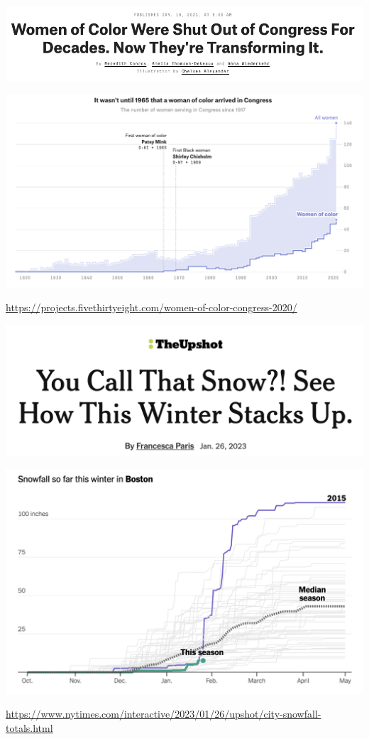 \documentclass[table]{beamer}\usepackage[]{graphicx}\usepackage[]{color}
\begin{document}
\begin{frame}

\centering

\includegraphics[width=\textwidth]{figure-static/538-women-of-color-banner.png}

\includegraphics[width=\textwidth]{figure-static/538-women-of-color-timeline.png}

\tiny \url{https://projects.fivethirtyeight.com/women-of-color-congress-2020/}

\end{frame}






\begin{frame}

\centering

\includegraphics[width=.6\textwidth]{figure-static/snow-headline.png}

\includegraphics[width=.9\textwidth]{figure-static/snow-boston.png}

\tiny \url{https://www.nytimes.com/interactive/2023/01/26/upshot/city-snowfall-totals.html}

\end{frame}
\end{document}
